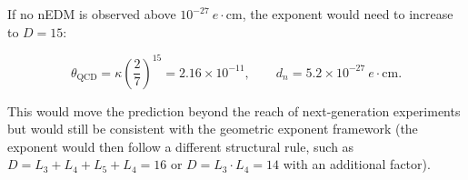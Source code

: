 If no nEDM is observed above \(10^{-27}\ e\cdot\text{cm}\), the exponent
would need to increase to \(D = 15\):

\[
\theta_{\text{QCD}} = \kappa\left(\frac{2}{7}\right)^{15}
                  = 2.16 \times 10^{-11},
\qquad
d_n = 5.2 \times 10^{-27}\ e\cdot\text{cm}.
\]

This would move the prediction beyond the reach of next-generation
experiments but would still be consistent with the geometric exponent
framework (the exponent would then follow a different structural
rule, such as \(D = L_3 + L_4 + L_5 + L_4 = 16\) or
\(D = L_3 \cdot L_4 = 14\) with an additional factor).
